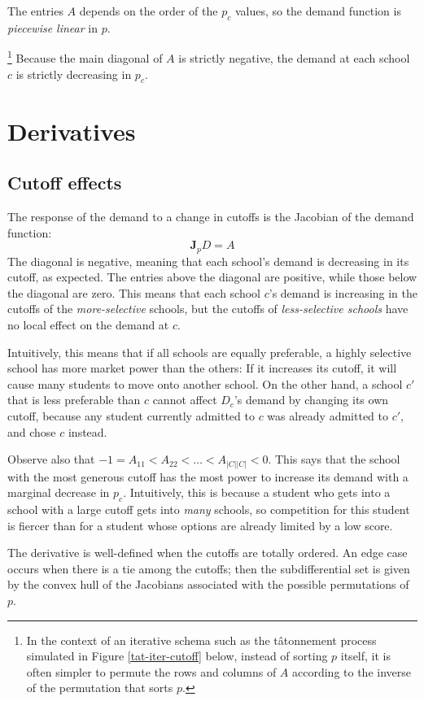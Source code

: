 \documentclass[12pt]{article}
\numberwithin{equation}{subsection}
\theoremstyle{definition}
\begin{document}
The entries $A$ depends on the order of the $p_c$ values, so the demand function is \emph{piecewise linear} in $p$.

\footnote{In the context of an iterative schema such as the t\^{a}tonnement process simulated in Figure \ref{tat-iter-cutoff} below, instead of sorting $p$ itself, it is often simpler to permute the rows and columns of $A$ according to the inverse of the permutation that sorts $p$.} Because the main diagonal of $A$ is strictly negative, the demand at each school $c$ is strictly decreasing in $p_c$. 

\section{Derivatives}
\subsection{Cutoff effects} \label{unconstrainedcutoffeffects}
The response of the demand to a change in cutoffs is the Jacobian of the demand function:
\[\mathbf{J}_p D = A \]
The diagonal is negative, meaning that each school's demand is decreasing in its cutoff, as expected. The entries above the diagonal are positive, while those below the diagonal are zero. This means that each school $c$'s demand is increasing in the cutoffs of the \emph{more-selective} schools, but the cutoffs of \emph{less-selective schools} have no local effect on the demand at $c$.

Intuitively, this means that if all schools are equally preferable, a highly selective school has more market power than the others: If it increases its cutoff, it will cause many students to move onto another school. On the other hand, a school $c'$ that is less preferable than $c$ cannot affect $D_c$'s demand by changing its own cutoff, because any student currently admitted to $c$ was already admitted to $c'$, and chose $c$ instead. 

Observe also that $-1 = A_{11} < A_{22} < \dots < A_{|C||C|} < 0$. This says that the school with the most generous cutoff has the most power to increase its demand with a marginal decrease in $p_c$. Intuitively, this is because a student who gets into a school with a large cutoff gets into \emph{many} schools, so competition for this student is fiercer than for a student whose options are already limited by a low score. 

The derivative is well-defined when the cutoffs are totally ordered. An edge case occurs when there is a tie among the cutoffs; then the subdifferential set is given by the convex hull of the Jacobians associated with the possible permutations of $p$. 
\end{document}
